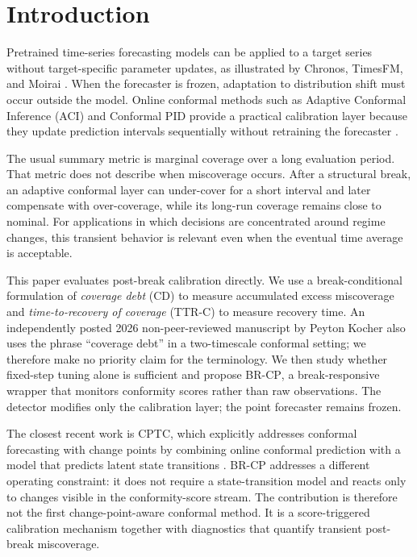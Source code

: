 \documentclass[10pt]{article}
\newcommand{\brcp}{\textsc{BR-CP}}
\begin{document}
\section{Introduction}
\label{sec:intro}

Pretrained time-series forecasting models can be applied to a target series without target-specific parameter updates, as illustrated by Chronos, TimesFM, and Moirai \citep{ansari2024chronos,das2024timesfm,woo2024moirai}. When the forecaster is frozen, adaptation to distribution shift must occur outside the model. Online conformal methods such as Adaptive Conformal Inference (ACI) and Conformal PID provide a practical calibration layer because they update prediction intervals sequentially without retraining the forecaster \citep{gibbs2021adaptive,angelopoulos2023conformal}.

The usual summary metric is marginal coverage over a long evaluation period. That metric does not describe when miscoverage occurs. After a structural break, an adaptive conformal layer can under-cover for a short interval and later compensate with over-coverage, while its long-run coverage remains close to nominal. For applications in which decisions are concentrated around regime changes, this transient behavior is relevant even when the eventual time average is acceptable.

This paper evaluates post-break calibration directly. We use a break-conditional formulation of \emph{coverage debt} (CD) to measure accumulated excess miscoverage and \emph{time-to-recovery of coverage} (TTR-C) to measure recovery time. An independently posted 2026 non-peer-reviewed manuscript by Peyton Kocher also uses the phrase ``coverage debt'' in a two-timescale conformal setting; we therefore make no priority claim for the terminology. We then study whether fixed-step tuning alone is sufficient and propose \brcp{}, a break-responsive wrapper that monitors conformity scores rather than raw observations. The detector modifies only the calibration layer; the point forecaster remains frozen.

The closest recent work is CPTC, which explicitly addresses conformal forecasting with change points by combining online conformal prediction with a model that predicts latent state transitions \citep{sun2025cptc}. \brcp{} addresses a different operating constraint: it does not require a state-transition model and reacts only to changes visible in the conformity-score stream. The contribution is therefore not the first change-point-aware conformal method. It is a score-triggered calibration mechanism together with diagnostics that quantify transient post-break miscoverage.
\end{document}
